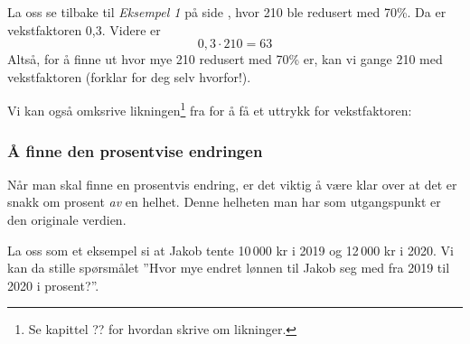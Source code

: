 La oss se tilbake til \textsl{Eksempel 1} på side \pageref{vekstfakteks}, hvor 210 ble redusert med 70\%. Da er vekstfaktoren 0,3. Videre er
\[ 0,3\cdot210=63 \]
Altså, for å finne ut hvor mye 210 redusert med 70\% er, kan vi gange 210 med vekstfaktoren (forklar for deg selv hvorfor!). \regv


\newpage
{} \vsk
Vi kan også omksrive likningen\footnote{Se kapittel ?? for hvordan skrive om likninger.} fra  for å få et uttrykk for vekstfaktoren: \regv

\subsubsection{Å finne den prosentvise endringen}
Når man skal finne en prosentvis endring, er det viktig å være klar over at det er snakk om prosent \textsl{av} en helhet. Denne helheten man har som utgangspunkt er den originale verdien. \vsk

La oss som et eksempel si at Jakob tente 10\,000 kr i 2019 og 12\,000 kr i 2020. Vi kan da stille spørsmålet ''Hvor mye endret lønnen til Jakob seg med fra 2019 til 2020 i prosent?''. \vsk


